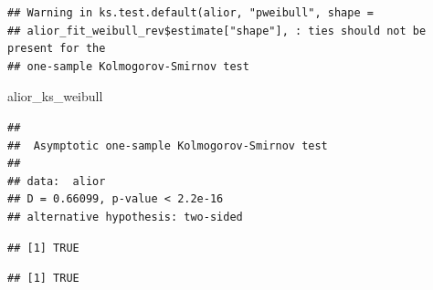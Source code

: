 \documentclass[
]{article}
\newenvironment{Shaded}{\begin{snugshade}}{\end{snugshade}}
\newcommand{\AttributeTok}[1]{\textcolor[rgb]{0.13,0.29,0.53}{#1}}
\newcommand{\FloatTok}[1]{\textcolor[rgb]{0.00,0.00,0.81}{#1}}
\newcommand{\FunctionTok}[1]{\textcolor[rgb]{0.13,0.29,0.53}{\textbf{#1}}}
\newcommand{\NormalTok}[1]{#1}
\newcommand{\OtherTok}[1]{\textcolor[rgb]{0.56,0.35,0.01}{#1}}
\newcommand{\SpecialCharTok}[1]{\textcolor[rgb]{0.81,0.36,0.00}{\textbf{#1}}}
\newcommand{\StringTok}[1]{\textcolor[rgb]{0.31,0.60,0.02}{#1}}
\begin{document}
\begin{verbatim}
## Warning in ks.test.default(alior, "pweibull", shape =
## alior_fit_weibull_rev$estimate["shape"], : ties should not be present for the
## one-sample Kolmogorov-Smirnov test
\end{verbatim}

\begin{Shaded}
\begin{Highlighting}[]
\NormalTok{alior\_ks\_weibull}
\end{Highlighting}
\end{Shaded}

\begin{verbatim}
## 
##  Asymptotic one-sample Kolmogorov-Smirnov test
## 
## data:  alior
## D = 0.66099, p-value < 2.2e-16
## alternative hypothesis: two-sided
\end{verbatim}

\begin{Shaded}
\end{Shaded}

\begin{verbatim}
## [1] TRUE
\end{verbatim}

\begin{Shaded}
\end{Shaded}

\begin{verbatim}
## [1] TRUE
\end{verbatim}

\begin{Shaded}
\end{Shaded}
\end{document}
